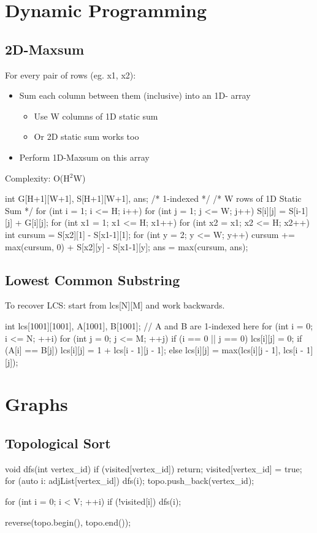 \documentclass{article}
\begin{document}
\section{Dynamic Programming}
\subsection{2D-Maxsum}
For every pair of rows (eg. x1, x2):
\begin{itemize}
  \item Sum each column between them (inclusive) into an 1D-
array
    \begin{itemize}
        \item Use W columns of 1D static sum
        \item Or 2D static sum works too
    \end{itemize}

  \item Perform 1D-Maxsum on this array
\end{itemize}
Complexity: O(H$^2$W)

\begin{mylisting}{}
int G[H+1][W+1], S[H+1][W+1], ans; /* 1-indexed */
/* W rows of 1D Static Sum */
for (int i = 1; i <= H; i++) 
    for (int j = 1; j <= W; j++) 
        S[i][j] = S[i-1][j] + G[i][j];
for (int x1 = 1; x1 <= H; x1++) {
    for (int x2 = x1; x2 <= H; x2++) {
        int cursum = S[x2][1] - S[x1-1][1];
        for (int y = 2; y <= W; y++) {
            cursum += max(cursum, 0) + S[x2][y] - S[x1-1][y];
            ans = max(cursum, ans);
        }
    }
}
\end{mylisting}

\subsection{Lowest Common Substring}
To recover LCS: start from lcs[N][M] and work backwards.
\begin{mylisting}{}
int lcs[1001][1001], A[1001], B[1001]; // A and B are 1-indexed here
for (int i = 0; i <= N; ++i) {
	for (int j = 0; j <= M; ++j) {
		if (i == 0 || j == 0) lcs[i][j] = 0;
		if (A[i] == B[j]) lcs[i][j] = 1 + lcs[i - 1][j - 1];
		else lcs[i][j] = max(lcs[i][j - 1], lcs[i - 1][j]);
	}
}
\end{mylisting}


\section{Graphs}
\subsection{Topological Sort}
\begin{mylisting}{}
void dfs(int vertex_id) {
	if (visited[vertex_id]) return;
	visited[vertex_id] = true;
	for (auto i: adjList[vertex_id]) {
		dfs(i);
	}
	topo.push_back(vertex_id);
}

for (int i = 0; i < V; ++i)
	if (!visited[i]) dfs(i);
	
reverse(topo.begin(), topo.end());
\end{mylisting}
\end{document}
